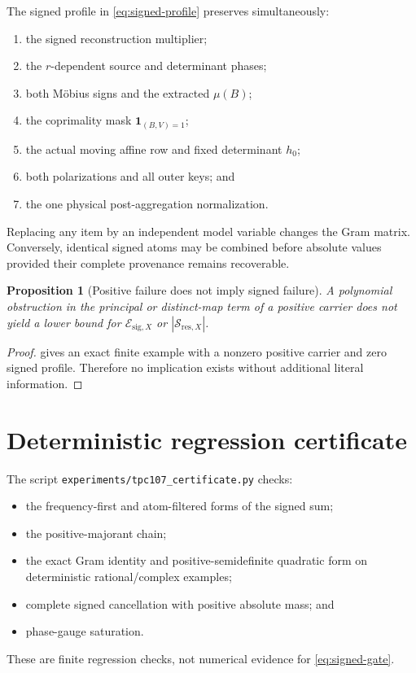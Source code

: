 \documentclass[11pt]{article}
\newtheorem{proposition}[theorem]{Proposition}
\theoremstyle{remark}
\newcommand{\one}{\mathbf 1}
\begin{document}
The signed profile in \eqref{eq:signed-profile} preserves
simultaneously:
\begin{enumerate}[label=(\roman*),leftmargin=2.2em]
\item the signed reconstruction multiplier;
\item the \(r\)-dependent source and determinant phases;
\item both M\"obius signs and the extracted \(\mu(B)\);
\item the coprimality mask \(\one_{(B,V)=1}\);
\item the actual moving affine row and fixed determinant \(h_0\);
\item both polarizations and all outer keys; and
\item the one physical post-aggregation normalization.
\end{enumerate}
Replacing any item by an independent model variable changes the
Gram matrix.  Conversely, identical signed atoms may be combined
before absolute values provided their complete provenance remains
recoverable.

\par\medskip
\begin{proposition}[Positive failure does not imply signed failure]
\label{prop:route-logic}
A polynomial obstruction in the principal or distinct-map term of a
positive carrier does not yield a lower bound for
\(\mathcal E_{\mathrm{sig},X}\) or
\(|\mathcal S_{\mathrm{res},X}|\).
\end{proposition}

\begin{proof}
 gives an exact finite example with a
nonzero positive carrier and zero signed profile.  Therefore no
implication exists without additional literal information.
\end{proof}

\section{Deterministic regression certificate}

The script \texttt{experiments/tpc107\_certificate.py} checks:
\begin{itemize}[leftmargin=2em]
\item the frequency-first and atom-filtered forms of the signed sum;
\item the positive-majorant chain;
\item the exact Gram identity and positive-semidefinite quadratic
form on deterministic rational/complex examples;
\item complete signed cancellation with positive absolute mass; and
\item phase-gauge saturation.
\end{itemize}
These are finite regression checks, not numerical evidence for
\eqref{eq:signed-gate}.
\end{document}
